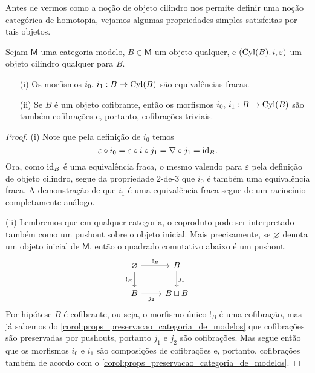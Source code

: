 Antes de vermos como a noção de objeto cilindro nos permite definir uma noção categórica de homotopia, vejamos algumas propriedades simples satisfeitas por tais objetos.

\begin{lema}\label{lema:props_obj_cilindro}
  Sejam $\mathsf{M}$ uma categoria modelo, $B \in \mathsf{M}$ um objeto qualquer, e $(\mathrm{Cyl}(B),i,\varepsilon)$ um objeto cilindro qualquer para $B$.
  \begin{enumerate}
  \item[(i)] Os morfismos $i_{0},\, i_{1}: B \to \mathrm{Cyl}(B)$ são equivalências fracas.
    
  \item[(ii)] Se $B$ é um objeto cofibrante, então os morfismos $i_{0},\, i_{1}: B \to \mathrm{Cyl}(B)$ são também cofibrações e, portanto, cofibrações triviais.
  \end{enumerate}
\end{lema}

\begin{proof}
  (i) Note que pela definição de $i_{0}$ temos
  \begin{displaymath}
    \varepsilon \circ i_{0} = \varepsilon \circ i \circ j_{1} = \nabla \circ j_{1} = \mathrm{id}_{B}.
  \end{displaymath}
  Ora, como $\mathrm{id}_{B}$ é uma equivalência fraca, o mesmo valendo para $\varepsilon$ pela definição de objeto cilindro, segue da propriedade 2-de-3 que $i_{0}$ é também uma equivalência fraca.
  A demonstração de que $i_{1}$ é uma equivalência fraca segue de um raciocínio completamente análogo.

  \smallskip
  (ii) Lembremos que em qualquer categoria, o coproduto pode ser interpretado também como um pushout sobre o objeto inicial.
  Mais precisamente, se $\varnothing$ denota um objeto inicial de $\mathsf{M}$, então o quadrado comutativo abaixo é um pushout.
  \begin{displaymath}
    \begin{tikzcd}
      \varnothing
      \arrow[r, "!_{B}"]
      \arrow[d, "!_{B}" swap]
      & B
      \arrow[d, "j_{1}"]
      \\ B
      \arrow[r, "j_{2}" swap]
      & B \sqcup B
    \end{tikzcd}
  \end{displaymath}
  Por hipótese $B$ é cofibrante, ou seja, o morfismo único $!_{B}$ é uma cofibração, mas já sabemos do \cref{corol:props_preservacao_categoria_de_modelos} que cofibrações são preservadas por pushouts, portanto $j_{1}$ e $j_{2}$ são cofibrações.
  Mas segue então que os morfismos $i_{0}$ e $i_{1}$ são composições de cofibrações e, portanto, cofibrações também de acordo com o \cref{corol:props_preservacao_categoria_de_modelos}.
\end{proof}


